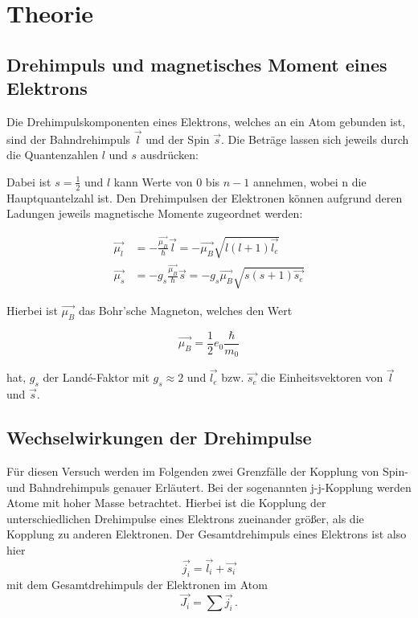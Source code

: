 \section{Theorie}
\label{sec:Theorie}

\subsection{Drehimpuls und magnetisches Moment eines Elektrons}

Die Drehimpulskomponenten eines Elektrons, welches an ein Atom gebunden ist, sind der Bahndrehimpuls $\vec{l}$ und der Spin $\vec{s}$.
Die Beträge lassen sich jeweils durch die Quantenzahlen $l$ und $s$ ausdrücken:


Dabei ist $s= \frac{1}2$ und $l$ kann Werte von $0$ bis $n-1$ annehmen, wobei n die Hauptquantelzahl ist. 
Den Drehimpulsen der Elektronen können aufgrund deren Ladungen jeweils magnetische Momente zugeordnet werden:

\begin{align}
    \vec{\mu_l} &= -\frac{\vec{\mu_B}}{\hbar}\vec{l} = -\vec{\mu_B}\sqrt{l(l+1)\vec{l_e}} \\
    \vec{\mu_s} &= -g_s\frac{\vec{\mu_B}}{\hbar}\vec{s} = -g_s\vec{\mu_B}\sqrt{s(s+1)\vec{s_e}} 
\end{align}

Hierbei ist $\vec{\mu_B}$ das Bohr'sche Magneton, welches den Wert 

\begin{equation}
    \vec{\mu_B} = \frac{1}2 e_0 \frac{\hbar}{m_0}
\end{equation}

hat, $g_s$ der Landé-Faktor mit $g_s\approx 2$ und $\vec{l_e}$ bzw. $\vec{s_e}$ die Einheitsvektoren von $\vec{l}$ und $\vec{s}$. 

\subsection{Wechselwirkungen der Drehimpulse}

Für diesen Versuch werden im Folgenden zwei Grenzfälle der Kopplung von Spin- und Bahndrehimpuls genauer Erläutert.
Bei der sogenannten j-j-Kopplung werden Atome mit hoher Masse betrachtet. Hierbei ist die Kopplung der unterschiedlichen Drehimpulse eines 
Elektrons zueinander größer, als die Kopplung zu anderen Elektronen. Der Gesamtdrehimpuls eines Elektrons ist also hier 
\begin{equation}
    \vec{j_i} = \vec{l_i} + \vec{s_i}
\end{equation} mit dem Gesamtdrehimpuls der Elektronen im Atom 
\begin{equation}
    \vec{J_i} = \sum \vec{j_i}\,.
\end{equation}

